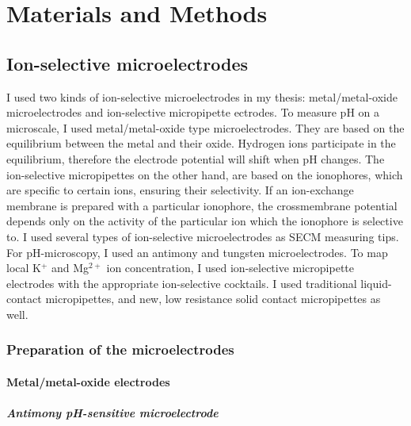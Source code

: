 \chapter{Materials and Methods}
\section{Ion-selective microelectrodes}
I used two kinds of ion-selective microelectrodes in my thesis: metal/metal-oxide microelectrodes and ion-selective micropipette ectrodes.
To measure pH on a microscale, I used metal/metal-oxide type microelectrodes.
They are based on the equilibrium between the metal and their oxide.
Hydrogen ions participate in the equilibrium, therefore the electrode potential will shift when pH changes.
The ion-selective micropipettes on the other hand, are based on the ionophores, which are specific to certain ions, ensuring their selectivity.
If an ion-exchange membrane is prepared with a particular ionophore, the crossmembrane potential depends only on the activity of the particular ion which the ionophore is selective to.
I used several types of ion-selective microelectrodes as SECM measuring tips.
For pH-microscopy, I used an antimony and tungsten microelectrodes.
To map local K$^+$ and Mg$^{2+}$ ion concentration, I used ion-selective micropipette electrodes with the appropriate ion-selective cocktails.
I used traditional liquid-contact micropipettes, and new, low resistance solid contact micropipettes as well.
		\subsection{Preparation of the microelectrodes}
			\subsubsection{Metal/metal-oxide electrodes}
				\paragraph{Antimony pH-sensitive microelectrode}

